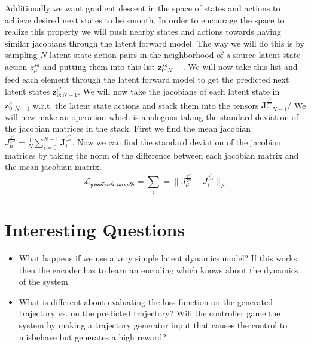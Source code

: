 \documentclass{article}
\begin{document}
Additionally we want gradient descent in the space of states and actions to achieve desired next states to be smooth.
In order to encourage the space to realize this property we will push nearby states and actions towards having similar jacobians through the latent forward model.
The way we will do this is by sampling \(N\) latent state action pairs in the neighborhood of a source latent state action \(z^{sa}_\mu\) and putting them into this list \(\mathbf{z}^{sa}_{0:N-1}\).
We will now take this list and feed each element through the latent forward model to get the predicted next latent states \(\mathbf{z}^{s'}_{0:N-1}\).
We will now take the jacobians of each latent state in \(\mathbf{z}^{s}_{0:N-1}\) w.r.t. the latent state actions and stack them into the tensors \(\mathbf{J}^{\frac{z^{s'}}{z^{sa}}}_{0:N-1}/\)
We will now make an operation which is analogous taking the standard deviation of the jacobian matrices in the stack.
First we find the mean jacobian \(J^{\frac{{z^s}'}{z^{sa}}}_\mu = \frac{1}{N}\sum\limits_{i=0}^{N-1} \mathbf{J}^{\frac{{z^s}'}{z^{sa}}}_{i}\).
Now we can find the standard deviation of the jacobian matrices by taking the norm of the difference between each jacobian matrix and the mean jacobian matrix.
$$\mathcal{L_\text{gradients smooth}}= \sum\limits_i = \|J^{\frac{z^{s'}}{z^{sa}}}_\mu - J^{\frac{z^{s'}}{z^{sa}}}_i\|_F$$


\section{Interesting Questions}

\begin{itemize}
    \item What happens if we use a very simple latent dynamics model? If this works then the encoder has to learn an encoding which knows about the dynamics of the system
    \item What is different about evaluating the loss function on the generated trajectory vs. on the predicted trajectory? Will the controller game the system by making a trajectory generator input that causes the control to misbehave but generates a high reward?
\end{itemize}
\end{document}
